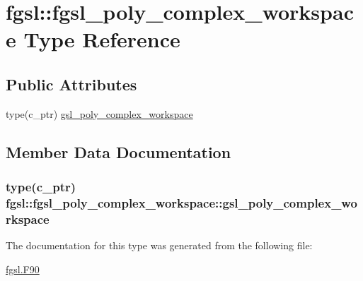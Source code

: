 \hypertarget{structfgsl_1_1fgsl__poly__complex__workspace}{\section{fgsl\-:\-:fgsl\-\_\-poly\-\_\-complex\-\_\-workspace Type Reference}
\label{structfgsl_1_1fgsl__poly__complex__workspace}
}
\subsection*{Public Attributes}
\begin{DoxyCompactItemize}
\item 
type(c\-\_\-ptr) \hyperlink{structfgsl_1_1fgsl__poly__complex__workspace_acd18b68a12097cd989a920a15105cd6a}{gsl\-\_\-poly\-\_\-complex\-\_\-workspace}
\end{DoxyCompactItemize}


\subsection{Member Data Documentation}
\hypertarget{structfgsl_1_1fgsl__poly__complex__workspace_acd18b68a12097cd989a920a15105cd6a}{
\subsubsection[{gsl\-\_\-poly\-\_\-complex\-\_\-workspace}]{\setlength{\rightskip}{0pt plus 5cm}type(c\-\_\-ptr) fgsl\-::fgsl\-\_\-poly\-\_\-complex\-\_\-workspace\-::gsl\-\_\-poly\-\_\-complex\-\_\-workspace}}\label{structfgsl_1_1fgsl__poly__complex__workspace_acd18b68a12097cd989a920a15105cd6a}


The documentation for this type was generated from the following file\-:\begin{DoxyCompactItemize}
\item 
\hyperlink{fgsl_8F90}{fgsl.\-F90}\end{DoxyCompactItemize}
